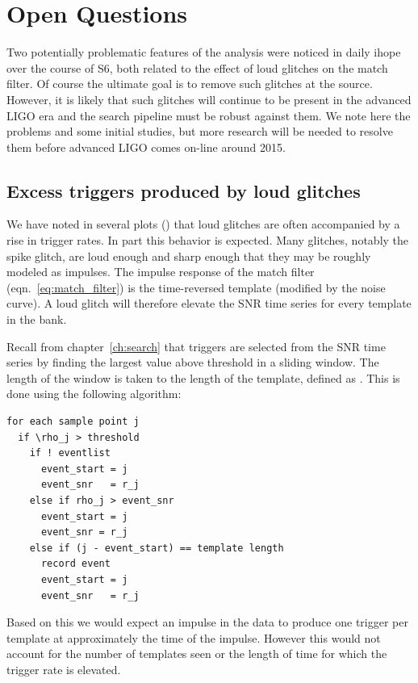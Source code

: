 \section{Open Questions}

Two potentially problematic features of the analysis were noticed in
daily ihope over the course of S6, both related to the effect of loud
glitches on the match filter.  Of course the ultimate goal is to
remove such glitches at the source.  However, it is likely that such
glitches will continue to be present in the advanced LIGO era and the
search pipeline must be robust against them.  We note here the
problems and some initial studies, but more research will be needed to
resolve them before advanced LIGO comes on-line around 2015.


\subsection{Excess triggers produced by loud glitches}
\label{ssec:penguins}

We have noted in several plots () that loud glitches are
often accompanied by a rise in trigger rates.  In part this behavior
is expected.  Many glitches, notably the spike glitch, are loud enough
and sharp enough that they may be roughly modeled as impulses.  The
impulse response of the match filter (eqn.~\ref{eq:match_filter}) is
the time-reversed template (modified by the noise curve).  A loud
glitch will therefore elevate the SNR time series for every template in
the bank.

Recall from chapter~\ref{ch:search} that triggers are selected from
the SNR time series by finding the largest value above threshold in a
sliding window.  The length of the window is taken to the length of
the template, defined as .  This is done using the
following algorithm:

\begin{verbatim}
for each sample point j
  if \rho_j > threshold
    if ! eventlist
      event_start = j
      event_snr   = r_j
    else if rho_j > event_snr
      event_start = j
      event_snr = r_j
    else if (j - event_start) == template length
      record event
      event_start = j
      event_snr   = r_j
\end{verbatim}

Based on this we would expect an impulse in the data to produce one
trigger per template at approximately the time of the impulse.
However this would not account for the number of templates seen or the
length of time for which the trigger rate is elevated. 

